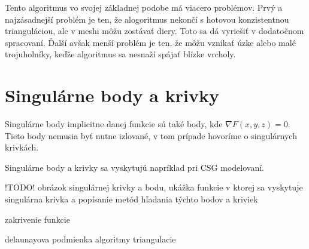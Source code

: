 Tento algoritmus vo svojej základnej podobe má viacero problémov. Prvý a najzásadnejší problém je ten,
že alogoritmus nekončí s hotovou konzistentnou trianguláciou, ale v meshi môžu zostávať diery. Toto sa
dá vyriešiť v dodatočnom spracovaní. Ďalší avšak menší problém je ten, že môžu vznikať úzke alebo 
malé trojuholníky, keďže algoritmus sa nesnaží spájať blízke vrcholy.

\newpage

\section{Singulárne body a krivky}

Singulárne body implicitne danej funkcie sú také body, kde $\nabla F(x, y, z) = 0$. Tieto body nemusia byť nutne izlované, 
v tom prípade hovoríme o singulárnych krivkách. 

Singulárne body a krivky sa vyskytujú napríklad pri CSG modelovaní.

\medskip

!TODO! obrázok singulárnej krivky a bodu, ukážka funkcie v ktorej sa vyskytuje singulárna 
krivka a popísanie metód hľadania týchto bodov a kriviek

\medskip

zakrivenie funkcie



delaunayova podmienka
algoritmy triangulacie







